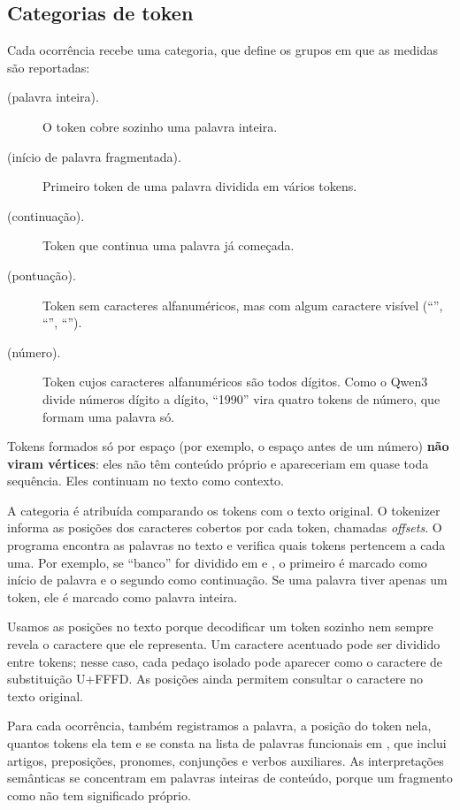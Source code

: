 \subsection{Categorias de token}\label{sec:categorias}

Cada ocorrência recebe uma categoria, que define os grupos em que as medidas são reportadas:

\begin{description}
    \item[ (palavra inteira).] O token cobre sozinho uma palavra inteira.
    \item[ (início de palavra fragmentada).] Primeiro token de uma palavra
    dividida em vários tokens.
    \item[ (continuação).] Token que continua uma palavra já começada.
    \item[ (pontuação).] Token sem caracteres alfanuméricos, mas com algum
    caractere visível (``\tok{\esp(}'', ``\tok{)}'', ``\tok{,}'').
    \item[ (número).] Token cujos caracteres alfanuméricos são todos dígitos. Como
    o Qwen3 divide números dígito a dígito, ``1990'' vira quatro tokens de número, que formam
    uma palavra só.
\end{description}

Tokens formados só por espaço (por exemplo, o espaço antes de um número) \textbf{não viram
vértices}: eles não têm conteúdo próprio e apareceriam em quase toda sequência. Eles
continuam no texto como contexto.

A categoria é atribuída comparando os tokens com o texto original. O tokenizer informa as
posições dos caracteres cobertos por cada token, chamadas \emph{offsets}. O programa encontra
as palavras no texto e verifica quais tokens pertencem a cada uma. Por exemplo, se ``banco''
for dividido em  e , o primeiro é marcado como início de palavra e o segundo
como continuação. Se uma palavra tiver apenas um token, ele é marcado como palavra inteira.

Usamos as posições no texto porque decodificar um token sozinho nem sempre revela o caractere
que ele representa. Um caractere acentuado pode ser dividido entre tokens; nesse caso, cada
pedaço isolado pode aparecer como o caractere de substituição U+FFFD. As posições ainda
permitem consultar o caractere no texto original.

Para cada ocorrência, também registramos a palavra, a posição do token nela, quantos tokens
ela tem e se consta na lista de palavras funcionais em , que inclui artigos,
preposições, pronomes, conjunções e verbos auxiliares. As interpretações semânticas se
concentram em palavras inteiras de conteúdo, porque um fragmento como  não tem
significado próprio.

